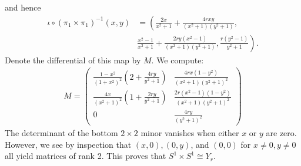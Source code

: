\documentclass{../mathnotes}
\begin{document}
\begin{enumerate}[(a)]
        and hence
        \begin{align*}
        \iota\circ(\pi_1\times\pi_1)^{-1}(x,y)&=\left( \frac{2x}{x^2+1}+\frac{4rxy}{(x^2+1)(y^2+1)},\right.\\ &\left.\frac{x^2-1}{x^2+1}+\frac{2ry(x^2-1)}{(x^2+1)(y^2+1)},\frac{r(y^2-1)}{y^2+1} \right).
        \end{align*}
        Denote the differential of this map by $M$. We compute:
        \begin{align*}
            M=
            \begin{pmatrix}
                \frac{1-x^2}{(1+x^2)^2}\left( 2+\frac{4ry}{y^2+1} \right)&\frac{4rx(1-y^2)}{(x^2+1)(y^2+1)^2}\\
                \frac{4x}{(x^2+1)^2}\left( 1+\frac{2ry}{y^2+1} \right)&\frac{2r(x^2-1)(1-y^2)}{(x^2+1)(y^2+1)^2}\\
                0&\frac{4ry}{(y^2+1)^2}
            \end{pmatrix}
        \end{align*}
        The determinant of the bottom $2\times 2$ minor vanishes when either $x$ or $y$ are zero. However,
        we see by inspection that $(x,0),(0,y)$, and $(0,0)$ for $x\neq0,y\neq0$ all yield matrices of rank 2.
        This proves that $S^1\times S^1\cong Y_r$.
\end{enumerate}
\end{document}
